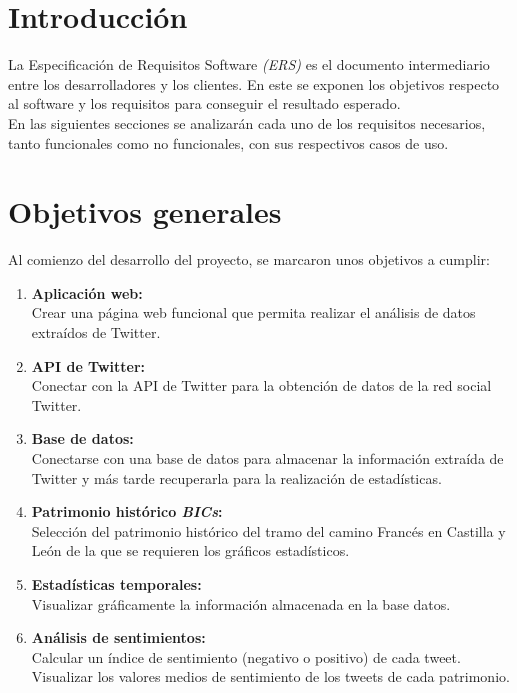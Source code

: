 
\section{Introducción}

La Especificación de Requisitos Software \textit{(ERS)} es el documento intermediario entre los desarrolladores y los clientes. 
En este se exponen los objetivos respecto al software y los requisitos para conseguir el resultado esperado. \\
En las siguientes secciones se analizarán cada uno de los requisitos necesarios, tanto funcionales como no funcionales, con sus respectivos casos de uso.

\section{Objetivos generales}
Al comienzo del desarrollo del proyecto, se marcaron unos objetivos a cumplir:
\begin{enumerate}
    \item \textbf{Aplicación web:}\\
    Crear una página web funcional que permita realizar el análisis de datos extraídos de Twitter.
    \item \textbf{API de Twitter:}\\
    Conectar con la API de Twitter para la obtención de datos de la red social Twitter.
    \item \textbf{Base de datos:}\\
    Conectarse con una base de datos para almacenar la información extraída de Twitter y más tarde recuperarla para la realización de estadísticas.
    \item \textbf{Patrimonio histórico \textit{BICs}:}\\
    Selección del patrimonio histórico del tramo del camino Francés en Castilla y León de la que se requieren los gráficos estadísticos.
    \item \textbf{Estadísticas temporales:}\\
    Visualizar gráficamente la información almacenada en la base datos.
    \item \textbf{Análisis de sentimientos:}\\
    Calcular un índice de sentimiento (negativo o positivo) de cada tweet. Visualizar los valores medios de sentimiento de los tweets de cada patrimonio.
\end{enumerate}
